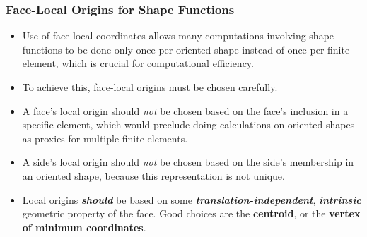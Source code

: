 \documentclass[compress]{beamer}
\begin{document}
\begin{frame}
  \frametitle{Face-Local Origins for Shape Functions}
  \begin{itemize}[<+->]
    \item Use of face-local coordinates allows many computations involving shape functions to be done only once per oriented shape
      instead of once per finite element, which is crucial for computational efficiency.
    \item To achieve this, face-local origins must be chosen carefully.
    \item A face's local origin should \emph{not} be chosen based on the face's inclusion in a specific element, which would preclude doing
          calculations on oriented shapes as proxies for multiple finite elements.
    \item A side's local origin should \emph{not} be chosen based on the side's membership in an oriented shape, because this representation
      is not unique.
    \item Local origins \emph{\textbf{should}} be based on some \emph{\textbf{translation-independent}}, \emph{\textbf{intrinsic}} geometric
      property of the face. Good choices are the \textbf{centroid}, or the \textbf{vertex of minimum coordinates}.
  \end{itemize}
\end{frame}
\end{document}
